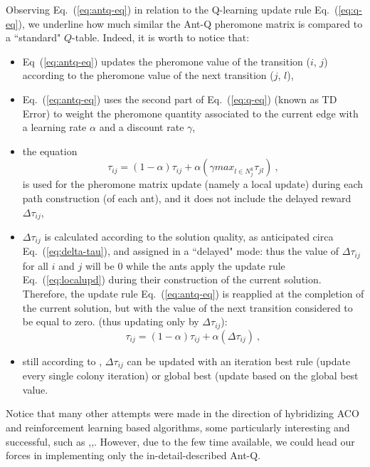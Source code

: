 \documentclass[10pt]{article}
\begin{document}
Observing Eq.~(\ref{eq:antq-eq}) in relation to the Q-learning update rule Eq.~(\ref{eq:q-eq}), we underline how much similar the Ant-Q pheromone matrix is compared to a ``standard" $Q$-table. Indeed, it is worth to notice that:
\begin{itemize}
\item  Eq~(\ref{eq:antq-eq})  updates the pheromone  value  of  the  transition  ($i$, $j$)  according to the  pheromone  value  of  the  next transition  ($j$, $ l$),
\item Eq.~(\ref{eq:antq-eq}) uses  the second part of Eq.~(\ref{eq:q-eq}) (known as TD Error) to  weight the  pheromone  quantity associated  to  the current  edge  with  a learning  rate $\alpha$  and  a discount  rate $\gamma$, 
\item the equation 
\begin{equation}
\tau_{ij}= (1-\alpha) \tau_{ij} + \alpha(\gamma max_{l\in N^k_j}\tau_{jl}) ~,
\label{eq:localupd}
\end{equation}
is used for the pheromone matrix update (namely a local update) during each path construction (of each ant), and it does not include the delayed reward $\Delta \tau_{ij}$,
\item $\Delta \tau_{ij}$ is calculated according to the solution quality, as anticipated circa Eq.~(\ref{eq:delta-tau}), and assigned in a ``delayed" mode: thus the value of $\Delta \tau_{ij}$  for all $i$ and $j$ will be $0$ while the ants  apply  the  update  rule Eq.~(\ref{eq:localupd})  during  their  construction  of the  current solution. 
Therefore, the update rule Eq.~(\ref{eq:antq-eq}) is reapplied at the completion of the current solution, but with the value of the next transition considered to be equal to zero. (thus updating only by $\Delta \tau_{ij}$):
\begin{equation}
\tau_{ij}= (1-\alpha) \tau_{ij} + \alpha(\Delta\tau_{ij}) ~,
\label{eq:antq-delay}
\end{equation}

\item still according to \cite{undici},\cite{diciotto} $\Delta \tau_{ij}$ can be updated with an iteration  best  rule (update every single colony iteration) or  global  best (update based on the global best value.
\end{itemize}

Notice that many other attempts were made in the direction of hybridizing ACO and reinforcement learning based algorithms, some particularly interesting and successful, such as \cite{sedici},\cite{quattordici},\cite{quindici}. However, due to the few time available, we could head our forces in implementing only the in-detail-described Ant-Q.
\end{document}
